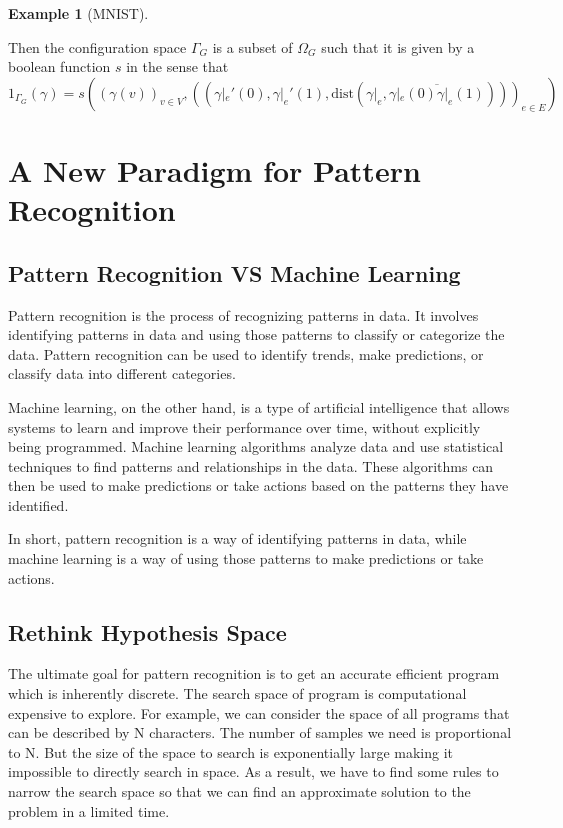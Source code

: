\documentclass[11pt]{article} 	%
\theoremstyle{definition}
\newtheorem*{example}{Example}
\begin{document}
\begin{example}[MNIST]
\begin{itemize}
Then the configuration space $\Gamma_G$ is a subset of $\Omega_G$ such that it is given by a boolean function $s$ in the sense that
\begin{equation}
	1_{\Gamma_G}(\gamma)=s((\gamma(v))_{v\in V},((\gamma|_e'(0), \gamma|_e'(1), \text{dist}(\gamma|_e,\overline{\gamma|_e(0)\gamma|_e(1)})))_{e\in E})
\end{equation}
\end{itemize}
\end{example}

\section{A New Paradigm for Pattern Recognition }
\subsection{Pattern Recognition VS Machine Learning}

Pattern recognition is the process of recognizing patterns in data. It involves identifying patterns in data and using those patterns to classify or categorize the data. Pattern recognition can be used to identify trends, make predictions, or classify data into different categories.

Machine learning, on the other hand, is a type of artificial intelligence that allows systems to learn and improve their performance over time, without explicitly being programmed. Machine learning algorithms analyze data and use statistical techniques to find patterns and relationships in the data. These algorithms can then be used to make predictions or take actions based on the patterns they have identified.

In short, pattern recognition is a way of identifying patterns in data, while machine learning is a way of using those patterns to make predictions or take actions.


\subsection{Rethink Hypothesis Space}

The ultimate goal for pattern recognition is to get an accurate efficient program which is inherently discrete.  The search space of program is computational expensive to explore.  For example, we can consider the space of all programs that can be described by N characters. The number of samples we need is proportional to N. But the size of the space to search is exponentially large making it impossible to directly search in space.  As a result, we have to find some rules to narrow the search space so that we can find an approximate solution to the problem in a limited time. 
\end{document}
